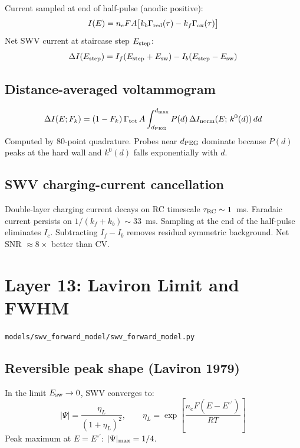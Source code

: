 \documentclass[10pt,a4paper]{article}
\numberwithin{equation}{section}
\newcommand{\file}[1]{\texttt{\small #1}}
\newcommand{\DI}{\Delta I}
\newcommand{\Grtot}{\Gamma_{\rm tot}}
\newcommand{\Grred}{\Gamma_{\rm red}}
\newcommand{\Grox}{\Gamma_{\rm ox}}
\newcommand{\kzero}{k^0}
\begin{document}
Current sampled at end of half-pulse (anodic positive):
\begin{equation}
  I(E) = n_e FA\bigl[k_b\Grred(\tau) - k_f\Grox(\tau)\bigr]
\end{equation}
Net SWV current at staircase step $E_{\rm step}$:
\begin{equation}
  \DI(E_{\rm step}) = I_f(E_{\rm step}+E_{\rm sw}) - I_b(E_{\rm step}-E_{\rm sw})
\end{equation}

\subsection{Distance-averaged voltammogram}

\begin{equation}
  \DI(E;F_k) = (1-F_k)\,\Grtot\,A
  \int_{d_{\rm PEG}}^{d_{\rm max}} P(d)\,\DI_{\rm norm}(E;\,\kzero(d))\,dd
\end{equation}
Computed by 80-point quadrature. Probes near $d_{\rm PEG}$ dominate because $P(d)$ peaks at
the hard wall and $\kzero(d)$ falls exponentially with $d$.

\subsection{SWV charging-current cancellation}

Double-layer charging current decays on RC timescale $\tau_{\rm RC}\sim1$~ms.
Faradaic current persists on $1/(k_f+k_b)\sim33$~ms. Sampling at the end
of the half-pulse eliminates $I_c$. Subtracting $I_f - I_b$ removes residual
symmetric background. Net SNR $\approx8\times$ better than CV.

\section{Layer 13: Laviron Limit and FWHM}
\file{models/swv\_forward\_model/swv\_forward\_model.py}

\subsection{Reversible peak shape (Laviron 1979)}

In the limit $E_{\rm sw}\to0$, SWV converges to:
\begin{equation}
  |\Psi| = \frac{\eta_L}{(1+\eta_L)^2},
  \qquad
  \eta_L = \exp\!\left[\frac{n_e F(E-E^{\circ\prime})}{RT}\right]
\end{equation}
Peak maximum at $E = E^{\circ\prime}$: $|\Psi|_{\rm max} = 1/4$.
\end{document}
